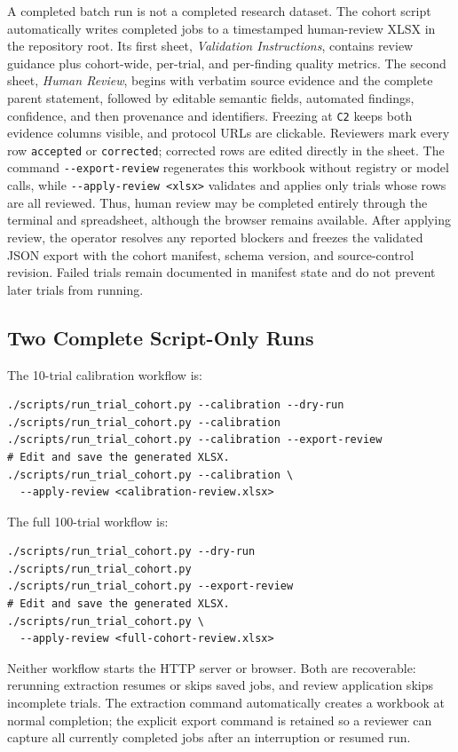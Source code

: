 \documentclass[11pt]{article}
\newcommand{\code}[1]{\nolinkurl{#1}}
\begin{document}
A completed batch run is not a completed research dataset. The cohort script automatically writes completed jobs to a timestamped human-review XLSX in the repository root. Its first sheet, \emph{Validation Instructions}, contains review guidance plus cohort-wide, per-trial, and per-finding quality metrics. The second sheet, \emph{Human Review}, begins with verbatim source evidence and the complete parent statement, followed by editable semantic fields, automated findings, confidence, and then provenance and identifiers. Freezing at \code{C2} keeps both evidence columns visible, and protocol URLs are clickable. Reviewers mark every row \code{accepted} or \code{corrected}; corrected rows are edited directly in the sheet. The command \code{--export-review} regenerates this workbook without registry or model calls, while \code{--apply-review <xlsx>} validates and applies only trials whose rows are all reviewed. Thus, human review may be completed entirely through the terminal and spreadsheet, although the browser remains available. After applying review, the operator resolves any reported blockers and freezes the validated JSON export with the cohort manifest, schema version, and source-control revision. Failed trials remain documented in manifest state and do not prevent later trials from running.

\subsection{Two Complete Script-Only Runs}

The 10-trial calibration workflow is:

\begin{verbatim}
./scripts/run_trial_cohort.py --calibration --dry-run
./scripts/run_trial_cohort.py --calibration
./scripts/run_trial_cohort.py --calibration --export-review
# Edit and save the generated XLSX.
./scripts/run_trial_cohort.py --calibration \
  --apply-review <calibration-review.xlsx>
\end{verbatim}

The full 100-trial workflow is:

\begin{verbatim}
./scripts/run_trial_cohort.py --dry-run
./scripts/run_trial_cohort.py
./scripts/run_trial_cohort.py --export-review
# Edit and save the generated XLSX.
./scripts/run_trial_cohort.py \
  --apply-review <full-cohort-review.xlsx>
\end{verbatim}

Neither workflow starts the HTTP server or browser. Both are recoverable: rerunning extraction resumes or skips saved jobs, and review application skips incomplete trials. The extraction command automatically creates a workbook at normal completion; the explicit export command is retained so a reviewer can capture all currently completed jobs after an interruption or resumed run.
\end{document}
